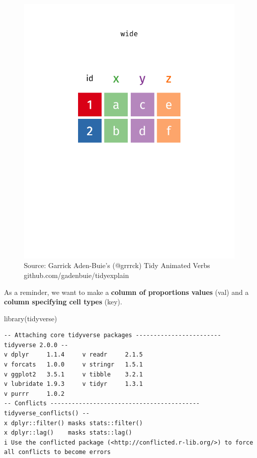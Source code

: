 \documentclass[
  letterpaper,
  DIV=11,
  numbers=noendperiod]{scrreprt}
\newenvironment{Shaded}{\begin{snugshade}}{\end{snugshade}}
\newcommand{\FunctionTok}[1]{\textcolor[rgb]{0.28,0.35,0.67}{#1}}
\newcommand{\NormalTok}[1]{\textcolor[rgb]{0.00,0.23,0.31}{#1}}
\begin{document}
\begin{figure}[H]

{\centering \includegraphics[width=1\textwidth,height=\textheight]{scripts/03_dataWrangling/wrangling-files/tidyr-pivoting.gif}

}

\caption{Source: Garrick Aden-Buie's (@grrrck) Tidy Animated Verbs
github.com/gadenbuie/tidyexplain}

\end{figure}%

As a reminder, we want to make a \textbf{column of proportions values}
(val) and a \textbf{column specifying cell types} (key).

\begin{Shaded}
\begin{Highlighting}[]
\FunctionTok{library}\NormalTok{(tidyverse)}
\end{Highlighting}
\end{Shaded}

\begin{verbatim}
-- Attaching core tidyverse packages ------------------------ tidyverse 2.0.0 --
v dplyr     1.1.4     v readr     2.1.5
v forcats   1.0.0     v stringr   1.5.1
v ggplot2   3.5.1     v tibble    3.2.1
v lubridate 1.9.3     v tidyr     1.3.1
v purrr     1.0.2     
-- Conflicts ------------------------------------------ tidyverse_conflicts() --
x dplyr::filter() masks stats::filter()
x dplyr::lag()    masks stats::lag()
i Use the conflicted package (<http://conflicted.r-lib.org/>) to force all conflicts to become errors
\end{verbatim}
\end{document}
